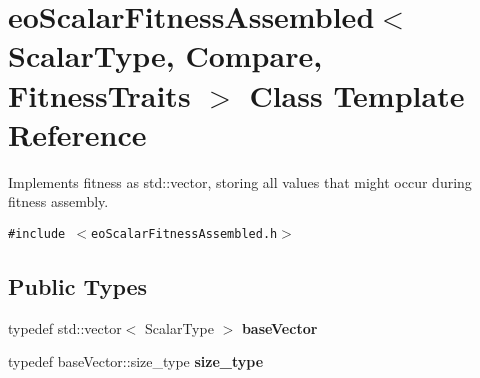 \section{eo\-Scalar\-Fitness\-Assembled$<$ Scalar\-Type, Compare, Fitness\-Traits $>$ Class Template Reference}
\label{classeo_scalar_fitness_assembled}
Implements fitness as std::vector, storing all values that might occur during fitness assembly.  


{\tt \#include $<$eo\-Scalar\-Fitness\-Assembled.h$>$}

\subsection*{Public Types}
\begin{CompactItemize}
\item 
typedef std::vector$<$ Scalar\-Type $>$ {\bf base\-Vector}\label{classeo_scalar_fitness_assembled_w0}

\item 
typedef base\-Vector::size\_\-type {\bf size\_\-type}\label{classeo_scalar_fitness_assembled_w1}

\end{CompactItemize}
